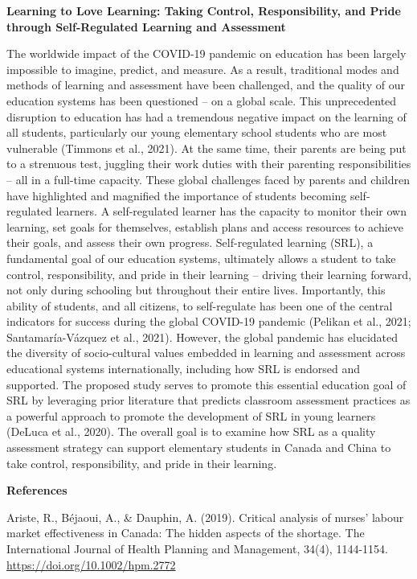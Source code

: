 \documentclass[
]{book}
\begin{document}
\textbf{Learning to Love Learning: Taking Control, Responsibility, and Pride through Self-Regulated Learning and Assessment}

The worldwide impact of the COVID-19 pandemic on education has been largely impossible to imagine, predict, and measure. As a result, traditional modes and methods of learning and assessment have been challenged, and the quality of our education systems has been questioned -- on a global scale. This unprecedented disruption to education has had a tremendous negative impact on the learning of all students, particularly our young elementary school students who are most vulnerable (Timmons et al., 2021). At the same time, their parents are being put to a strenuous test, juggling their work duties with their parenting responsibilities -- all in a full-time capacity. These global challenges faced by parents and children have highlighted and magnified the importance of students becoming self-regulated learners. A self-regulated learner has the capacity to monitor their own learning, set goals for themselves, establish plans and access resources to achieve their goals, and assess their own progress. Self-regulated learning (SRL), a fundamental goal of our education systems, ultimately allows a student to take control, responsibility, and pride in their learning -- driving their learning forward, not only during schooling but throughout their entire lives. Importantly, this ability of students, and all citizens, to self-regulate has been one of the central indicators for success during the global COVID-19 pandemic (Pelikan et al., 2021; Santamaría-Vázquez et al., 2021). However, the global pandemic has elucidated the diversity of socio-cultural values embedded in learning and assessment across educational systems internationally, including how SRL is endorsed and supported. The proposed study serves to promote this essential education goal of SRL by leveraging prior literature that predicts classroom assessment practices as a powerful approach to promote the development of SRL in young learners (DeLuca et al., 2020). The overall goal is to examine how SRL as a quality assessment strategy can support elementary students in Canada and China to take control, responsibility, and pride in their learning.

\textbf{References}

Ariste, R., Béjaoui, A., \& Dauphin, A. (2019). Critical analysis of nurses' labour market effectiveness in Canada: The hidden aspects of the shortage. The International Journal of Health Planning and Management, 34(4), 1144-1154. \url{https://doi.org/10.1002/hpm.2772}
\end{document}
